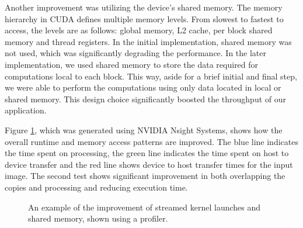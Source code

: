 Another improvement was utilizing the device's shared memory. The memory hierarchy in CUDA defines multiple memory levels. From slowest to fastest to access, the levels are as follows: global memory, L2 cache, per block shared memory and thread registers. In the initial implementation, shared memory was not used, which was significantly degrading the performance. In the later implementation, we used shared memory to store the data required for computations local to each block. This way, aside for a brief initial and final step, we were able to perform the computations using only data located in local or shared memory. This design choice significantly boosted the throughput of our application. 

Figure \ref{fig:cuda_profile}, which was generated using NVIDIA Nsight Systems, shows how the overall runtime and memory access patterns are improved. The blue line indicates the time spent on processing, the green line indicates the time spent on host to device transfer and the red line shows device to host transfer times for the input image. The second test shows significant improvement in both overlapping the copies and processing and reducing execution time.

\begin{figure}[ht]
    \centering
    \caption{An example of the improvement of streamed kernel launches and shared memory, shown using a profiler.}
    \label{fig:cuda_profile}
\end{figure}


